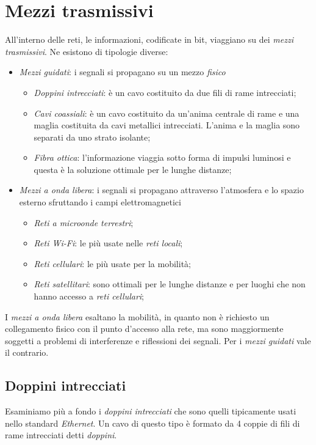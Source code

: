 \section{Mezzi trasmissivi}
All'interno delle reti, le informazioni, codificate in bit, viaggiano su dei
\emph{mezzi trasmissivi}. Ne esistono di tipologie diverse:
\begin{itemize}
    \item \emph{Mezzi guidati}: i segnali si propagano su un mezzo \emph{fisico}
    \begin{itemize}
        \item \emph{Doppini intrecciati}: è un cavo costituito da due fili di rame
        intrecciati;
        \item \emph{Cavi coassiali}: è un cavo costituito da un'anima centrale di
        rame e una maglia costituita da cavi metallici intrecciati. L'anima e la
        maglia sono separati da uno strato isolante;
        \item \emph{Fibra ottica}: l'informazione viaggia sotto forma di impulsi
        luminosi e questa è la soluzione ottimale per le lunghe distanze;
    \end{itemize}
    \item \emph{Mezzi a onda libera}: i segnali si propagano attraverso l'atmosfera
    e lo spazio esterno sfruttando i campi elettromagnetici
    \begin{itemize}
        \item \emph{Reti a microonde terrestri};
        \item \emph{Reti Wi-Fi}: le più usate nelle \emph{reti locali};
        \item \emph{Reti cellulari}: le più usate per la mobilità;
        \item \emph{Reti satellitari}: sono ottimali per le lunghe distanze e per
        luoghi che non hanno accesso a \emph{reti cellulari};
    \end{itemize}
\end{itemize}
I \emph{mezzi a onda libera} esaltano la mobilità, in quanto non è richiesto un
collegamento fisico con il punto d'accesso alla rete, ma sono maggiormente soggetti
a problemi di interferenze e riflessioni dei segnali. Per i \emph{mezzi guidati}
vale il contrario.

\subsection{Doppini intrecciati}
Esaminiamo più a fondo i \emph{doppini intrecciati} che sono quelli tipicamente
usati nello standard \emph{Ethernet}. Un cavo di questo tipo è formato da 4
coppie di fili di rame intrecciati detti \emph{doppini}.

